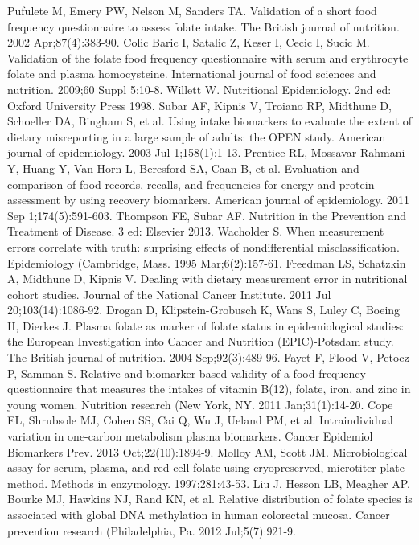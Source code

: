 \begin{thebibliography}{12}
		Pufulete M, Emery PW, Nelson M, Sanders TA. Validation of a short food frequency questionnaire to assess folate intake. The British journal of nutrition. 2002 Apr;87(4):383-90.
		Colic Baric I, Satalic Z, Keser I, Cecic I, Sucic M. Validation of the folate food frequency questionnaire with serum and erythrocyte folate and plasma homocysteine. International journal of food sciences and nutrition. 2009;60 Suppl 5:10-8.
		Willett W. Nutritional Epidemiology. 2nd ed: Oxford University Press 1998.
		Subar AF, Kipnis V, Troiano RP, Midthune D, Schoeller DA, Bingham S, et al. Using intake biomarkers to evaluate the extent of dietary misreporting in a large sample of adults: the OPEN study. American journal of epidemiology. 2003 Jul 1;158(1):1-13.
		Prentice RL, Mossavar-Rahmani Y, Huang Y, Van Horn L, Beresford SA, Caan B, et al. Evaluation and comparison of food records, recalls, and frequencies for energy and protein assessment by using recovery biomarkers. American journal of epidemiology. 2011 Sep 1;174(5):591-603.
		Thompson FE, Subar AF. Nutrition in the Prevention and Treatment of Disease. 3 ed: Elsevier 2013.
		Wacholder S. When measurement errors correlate with truth: surprising effects of nondifferential misclassification. Epidemiology (Cambridge, Mass. 1995 Mar;6(2):157-61.
		Freedman LS, Schatzkin A, Midthune D, Kipnis V. Dealing with dietary measurement error in nutritional cohort studies. Journal of the National Cancer Institute. 2011 Jul 20;103(14):1086-92.
		Drogan D, Klipstein-Grobusch K, Wans S, Luley C, Boeing H, Dierkes J. Plasma folate as marker of folate status in epidemiological studies: the European Investigation into Cancer and Nutrition (EPIC)-Potsdam study. The British journal of nutrition. 2004 Sep;92(3):489-96.
		Fayet F, Flood V, Petocz P, Samman S. Relative and biomarker-based validity of a food frequency questionnaire that measures the intakes of vitamin B(12), folate, iron, and zinc in young women. Nutrition research (New York, NY. 2011 Jan;31(1):14-20.
		Cope EL, Shrubsole MJ, Cohen SS, Cai Q, Wu J, Ueland PM, et al. Intraindividual variation in one-carbon metabolism plasma biomarkers. Cancer Epidemiol Biomarkers Prev. 2013 Oct;22(10):1894-9.
		Molloy AM, Scott JM. Microbiological assay for serum, plasma, and red cell folate using cryopreserved, microtiter plate method. Methods in enzymology. 1997;281:43-53.
		Liu J, Hesson LB, Meagher AP, Bourke MJ, Hawkins NJ, Rand KN, et al. Relative distribution of folate species is associated with global DNA methylation in human colorectal mucosa. Cancer prevention research (Philadelphia, Pa. 2012 Jul;5(7):921-9.

\end{thebibliography}
